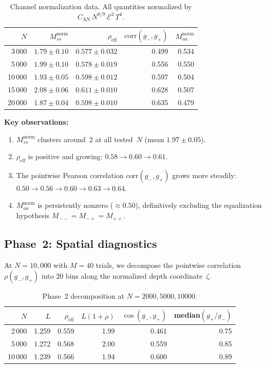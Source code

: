 \documentclass[11pt,a4paper]{article}
\begin{document}
\begin{table}[h]
\centering
\caption{Channel normalization data.  All quantities normalized by $C_\mathrm{AN}\,N^{8/9}\,\mathcal{E}^2\,T^4$.}
\label{tab:channels}
\begin{tabular}{rrrrr}
\toprule
$N$ & $M_{ss}^{\mathrm{norm}}$ & $\rho_{\mathrm{eff}}$ & $\mathrm{corr}(g_-,g_+)$ & $M_{aa}^{\mathrm{norm}}$ \\
\midrule
3\,000  & $1.79 \pm 0.10$ & $0.577 \pm 0.032$ & 0.499 & 0.534 \\
5\,000  & $1.99 \pm 0.10$ & $0.578 \pm 0.019$ & 0.556 & 0.550 \\
10\,000 & $1.93 \pm 0.05$ & $0.598 \pm 0.012$ & 0.597 & 0.504 \\
15\,000 & $2.08 \pm 0.06$ & $0.611 \pm 0.010$ & 0.628 & 0.507 \\
20\,000 & $1.87 \pm 0.04$ & $0.598 \pm 0.010$ & 0.635 & 0.479 \\
\bottomrule
\end{tabular}
\end{table}

\textbf{Key observations:}
\begin{enumerate}
\item $M_{ss}^{\mathrm{norm}}$ clusters around~2 at all tested~$N$ (mean $1.97 \pm 0.05$).
\item $\rho_{\mathrm{eff}}$ is positive and growing: $0.58 \to 0.60 \to 0.61$.
\item The pointwise Pearson correlation $\mathrm{corr}(g_-,g_+)$ grows more steadily: $0.50 \to 0.56 \to 0.60 \to 0.63 \to 0.64$.
\item $M_{aa}^{\mathrm{norm}}$ is persistently nonzero ($\approx 0.50$), definitively excluding the equalization hypothesis $M_{--} = M_{-+} = M_{++}$.
\end{enumerate}

\subsection{Phase~2: Spatial diagnostics}

At $N = 10{,}000$ with $M = 40$ trials, we decompose the pointwise correlation $\rho(g_-,g_+)$
into 20 bins along the normalized depth coordinate~$\zeta$.

\begin{table}[h]
\centering
\caption{Phase~2 decomposition at $N = 2000, 5000, 10000$.}
\label{tab:phase2}
\begin{tabular}{rrrrrr}
\toprule
$N$ & $L$ & $\rho_{\mathrm{eff}}$ & $L(1{+}\rho)$ & $\cos(g_-,g_+)$ & median$(g_+/g_-)$ \\
\midrule
2\,000  & 1.259 & 0.559 & 1.99 & 0.461 & 0.75 \\
5\,000  & 1.272 & 0.568 & 2.00 & 0.559 & 0.85 \\
10\,000 & 1.239 & 0.566 & 1.94 & 0.600 & 0.89 \\
\bottomrule
\end{tabular}
\end{table}
\end{document}
